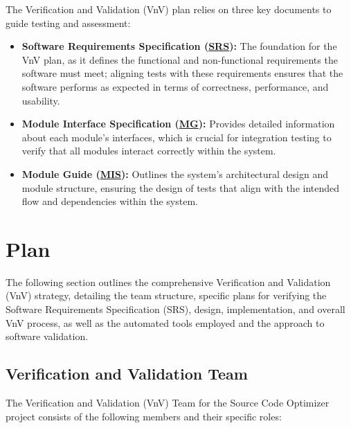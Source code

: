 \documentclass[12pt, titlepage]{article}
\newcommand{\SRS}{\href{https://github.com/ssm-lab/capstone--source-code-optimizer/blob/main/docs/SRS/SRS.pdf}{SRS}}
\newcommand{\MG}{\href{https://github.com/ssm-lab/capstone--source-code-optimizer/blob/main/docs/Design/SoftArchitecture/MG.pdf}{MG}}
\newcommand{\MIS}{\href{https://github.com/ssm-lab/capstone--source-code-optimizer/blob/main/docs/Design/SoftDetailedDes/MIS.pdf}{MIS}}
\begin{document}
The Verification and Validation (VnV) plan relies on three key documents to guide testing and assessment: 
\begin{itemize}
  \item[] \textbf{Software Requirements Specification (\SRS)\cite{SRS}:} The foundation for the VnV plan, as it defines the functional and non-functional requirements the software must meet; aligning tests with these requirements ensures that the software performs as expected in terms of correctness, performance, and usability.
  
  \item[] \textbf{Module Interface Specification (\MG)\cite{MGDoc}:} Provides detailed information about each module's interfaces, which is crucial for integration testing to verify that all modules interact correctly within the system.
  
  \item[] \textbf{Module Guide (\MIS)\cite{MISDoc}:} Outlines the system's architectural design and module structure, ensuring the design of tests that align with the intended flow and dependencies within the system.
\end{itemize}

\section{Plan}

The following section outlines the comprehensive Verification and Validation (VnV) strategy, detailing the team structure, specific plans for verifying the Software Requirements Specification (SRS), design, implementation, and overall VnV process, as well as the automated tools employed and the approach to software validation.

\subsection{Verification and Validation Team}

The Verification and Validation (VnV) Team for the Source Code Optimizer project consists of the following members and their specific roles:
\end{document}

